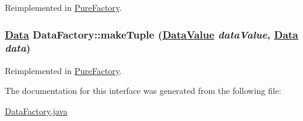Reimplemented in \hyperlink{classPureFactory_a2}{Pure\-Factory}.\hypertarget{interfaceDataFactory_a1}{
\subsubsection[makeTuple]{\setlength{\rightskip}{0pt plus 5cm}\hyperlink{interfaceData}{Data} Data\-Factory::make\-Tuple (\hyperlink{interfaceDataValue}{Data\-Value} {\em data\-Value}, \hyperlink{interfaceData}{Data} {\em data})}}
\label{interfaceDataFactory_a1}




Reimplemented in \hyperlink{classPureFactory_a12}{Pure\-Factory}.

The documentation for this interface was generated from the following file:\begin{CompactItemize}
\item 
\hyperlink{DataFactory_8java-source}{Data\-Factory.java}\end{CompactItemize}
